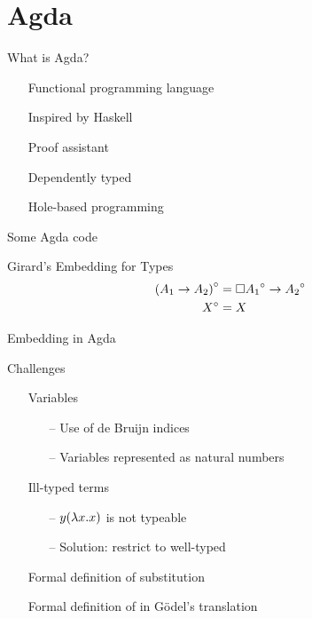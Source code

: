 \documentclass{beamer}
\theoremstyle{definition}
\begin{document}
  \section{Agda}

  \begin{frame}{What is Agda?}
    \begin{itemize}
      \item[\textbullet] Functional programming language
      \item[\textbullet] Inspired by Haskell
      \item[\textbullet] Proof assistant
      \item[\textbullet] Dependently typed
      \item[\textbullet] Hole-based programming
    \end{itemize}
  \end{frame}

  \begin{frame}{Some Agda code}
    \begin{block}{Girard's Embedding for Types}
      \begin{align*}
        {(A_1 \to A_2)}^\circ     & = \square{{A_1}^\circ} \to {A_2}^\circ      \\                                         
        {X}^\circ                 & = X                                         
      \end{align*}
    \end{block} \pause
    \begin{block}{Embedding in Agda}
      
    \end{block}
  \end{frame}

  \begin{frame}{Challenges}
    \begin{itemize}
      \item[\textbullet] Variables
        \begin{itemize}
          \item[--] Use of \alert{de Bruijn indices}
          \item[--] Variables represented as natural numbers
        \end{itemize} \pause
      \item[\textbullet] Ill-typed terms
        \begin{itemize}
          \item[--] \lterm $y (\lambda {x}.{x})$ is not typeable
          \item[--] Solution: restrict to \alert{well-typed} \lterms
        \end{itemize} \pause
      \item[\textbullet] Formal definition of \alert{substitution}
      \item[\textbullet] Formal definition of \alert{\raiseembn} in Gödel's translation %
    \end{itemize}
  \end{frame}
\end{document}
